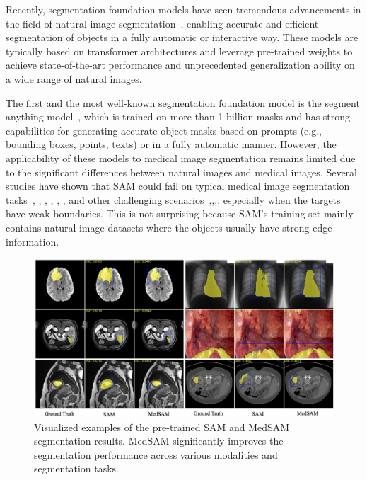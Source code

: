 \documentclass[runningheads]{llncs}
\begin{document}
Recently, segmentation foundation models have seen tremendous advancements in the field of natural image segmentation~\cite{2023-SAM-Meta}\cite{2023-SegGPT}\cite{2023-SEEM}, enabling accurate and efficient segmentation of objects in a fully automatic or interactive way. These models are typically based on transformer architectures and leverage pre-trained weights to achieve state-of-the-art performance and unprecedented generalization ability on a wide range of natural images. 

The first and the most well-known segmentation foundation model is the segment anything model~\cite{2023-SAM-Meta}, which is trained on more than 1 billion masks and has strong capabilities for generating accurate object masks based on prompts (e.g., bounding boxes, points, texts) or in a fully automatic manner. 
However, the applicability of these models to medical image segmentation remains limited due to the significant differences between natural images and medical images. Several studies have shown that SAM could fail on typical medical image segmentation tasks~\cite{SAM-pathology}, \cite{SAM-LiverTumor}, \cite{SAM-Meds}, \cite{SAM-DKFZ-Abdomen}, \cite{SAM-Polyps}, \cite{SAM-BrainMR}, \cite{SAM-Meds-2} and other challenging scenarios~\cite{SAM-Infrared},\cite{SAM-Camouflaged},\cite{SAM-Camouflaged2},\cite{SAM-RealworldApplication}, especially when the targets have weak boundaries. This is not surprising because SAM's training set mainly contains natural image datasets where the objects usually have strong edge information.

\begin{figure}[htbp]
\centering
\includegraphics[scale=0.3]{imgs/fig1-seg-eg.png}
\caption{Visualized examples of the pre-trained SAM and MedSAM segmentation results. MedSAM significantly improves the segmentation performance across various modalities and segmentation tasks.}
\label{fig:sam-medsam}
\end{figure}
\end{document}
